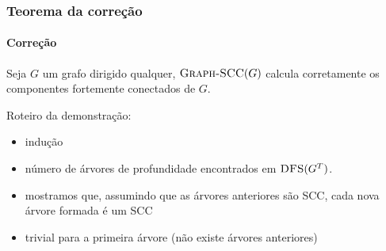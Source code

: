 \documentclass{beamer}
\begin{document}

\begin{frame}
\frametitle{Teorema da correção}
\framesubtitle{Correção}

\begin{theorem}
Seja $G$ um grafo dirigido qualquer, $\textnormal{\scshape Graph-SCC}(G)$ calcula
corretamente os componentes fortemente conectados de $G$.
\end{theorem}

\pause

Roteiro da demonstração:
\begin{itemize}
\item indução 
\item número de árvores de profundidade encontrados em $\textnormal{\scshape DFS}(G^T)$.
\item mostramos que, assumindo que as árvores anteriores são SCC, 
  cada nova árvore formada é um SCC
\item trivial para a primeira árvore (não existe árvores anteriores)
\end{itemize}

\end{frame}

\end{document}

